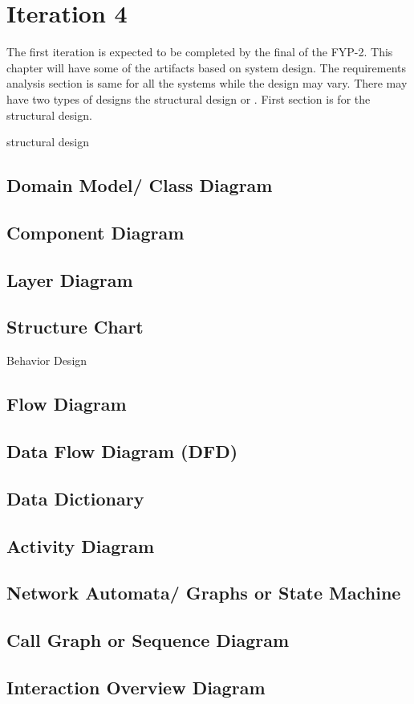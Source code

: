 \chapter{Iteration 4}
\label{ch:iter4}

The first iteration is expected to be completed by the final of the FYP-2.
This chapter will have some of the artifacts based on system design. The requirements analysis section is same for all the systems while the design may vary. There may have two types of designs the structural design or . First section is for the structural design.

structural design
\section{Domain Model/ Class Diagram}
\section{Component Diagram}
\section{Layer Diagram}
\section{Structure Chart}
Behavior Design
\section{Flow Diagram}
\section{Data Flow Diagram (DFD)}
\section{Data Dictionary}
\section{Activity Diagram}
\section{Network Automata/ Graphs or State Machine}
\section{Call Graph or Sequence Diagram}
\section{Interaction Overview Diagram}

